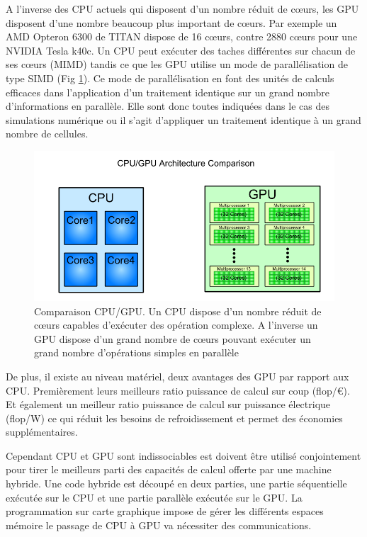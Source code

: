 A l'inverse des \ac{CPU} actuels qui disposent d'un nombre réduit de cœurs, les \ac{GPU} disposent d'une nombre beaucoup plus important de cœurs.
Par exemple un AMD Opteron 6300 de TITAN dispose de 16 cœurs, contre 2880 cœurs pour une NVIDIA Tesla k40c.
Un  \ac{CPU} peut exécuter des taches différentes sur chacun de ses cœurs (MIMD) tandis ce que les \ac{GPU} utilise un mode de parallélisation de type SIMD (Fig \ref{fig:cpugpu}).
Ce mode de parallélisation en font des unités de calculs efficaces dans l'application d'un traitement identique sur un grand nombre d'informations en parallèle.
Elle sont donc toutes indiquées dans le cas des simulations numérique ou il s'agit d'appliquer un traitement identique à un grand nombre de cellules.

\begin{figure}
        \includegraphics[width=.95\linewidth]{img/02/cpu_vs_gpu.png} 
        \caption[Comparaison CPU/GPU]{Comparaison CPU/GPU. Un \ac{CPU} dispose d'un nombre réduit de cœurs capables d’exécuter des opération complexe. 
        A l'inverse un \ac{GPU} dispose d'un grand nombre de cœurs pouvant exécuter un grand nombre d'opérations simples en parallèle}
 		\label{fig:cpugpu}
\end{figure} 

De plus, il existe au niveau matériel, deux avantages des \ac{GPU} par rapport aux \ac{CPU}.
Premièrement leurs meilleurs ratio puissance de calcul sur coup (flop/€).
Et également un meilleur ratio puissance de calcul sur puissance électrique (flop/W) ce qui réduit les besoins de refroidissement et permet des économies supplémentaires.

Cependant \ac{CPU} et \ac{GPU} sont indissociables est doivent être utilisé conjointement pour tirer le meilleurs parti des capacités de calcul offerte par une machine hybride.
Une code hybride est découpé en deux parties, une partie séquentielle exécutée sur le \ac{CPU} et une partie parallèle exécutée sur le \ac{GPU}.
La programmation sur carte graphique impose de gérer les différents espaces mémoire le passage de \ac{CPU} à \ac{GPU} va nécessiter des communications.


